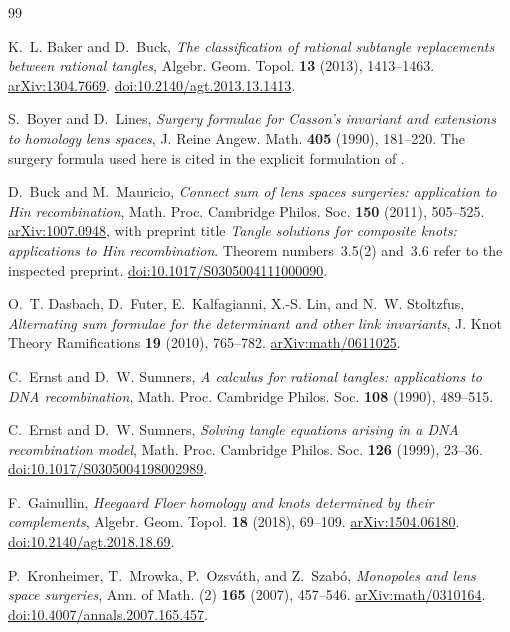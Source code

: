 \documentclass[11pt]{amsart}
\theoremstyle{definition}
\theoremstyle{remark}
\begin{document}
\begin{thebibliography}{99}

K.~L. Baker and D.~Buck,
\emph{The classification of rational subtangle replacements
between rational tangles},
Algebr. Geom. Topol. \textbf{13} (2013), 1413--1463.
\href{https://arxiv.org/abs/1304.7669}{arXiv:1304.7669}.
\href{https://doi.org/10.2140/agt.2013.13.1413}{doi:10.2140/agt.2013.13.1413}.

S.~Boyer and D.~Lines,
\emph{Surgery formulae for Casson's invariant and extensions
to homology lens spaces},
J. Reine Angew. Math. \textbf{405} (1990), 181--220.
The surgery formula used here is cited in the explicit
formulation of \cite[Proposition~3.1]{NiWu}.

D.~Buck and M.~Mauricio,
\emph{Connect sum of lens spaces surgeries: application
to Hin recombination},
Math. Proc. Cambridge Philos. Soc. \textbf{150} (2011),
505--525.
\href{https://arxiv.org/abs/1007.0948}{arXiv:1007.0948}, with preprint title
\emph{Tangle solutions for composite knots: applications to Hin recombination}.
Theorem numbers~3.5(2) and~3.6 refer to the inspected preprint.
\href{https://doi.org/10.1017/S0305004111000090}{doi:10.1017/S0305004111000090}.

O.~T. Dasbach, D.~Futer, E.~Kalfagianni,
X.-S. Lin, and N.~W. Stoltzfus,
\emph{Alternating sum formulae for the determinant
and other link invariants},
J. Knot Theory Ramifications \textbf{19} (2010),
765--782.
\href{https://arxiv.org/abs/math/0611025}{arXiv:math/0611025}.

C.~Ernst and D.~W. Sumners,
\emph{A calculus for rational tangles: applications
to DNA recombination},
Math. Proc. Cambridge Philos. Soc. \textbf{108}
(1990), 489--515.

C.~Ernst and D.~W. Sumners,
\emph{Solving tangle equations arising in a DNA recombination model},
Math. Proc. Cambridge Philos. Soc. \textbf{126} (1999), 23--36.
\href{https://doi.org/10.1017/S0305004198002989}{doi:10.1017/S0305004198002989}.

F.~Gainullin,
\emph{Heegaard Floer homology and knots determined
by their complements},
Algebr. Geom. Topol. \textbf{18} (2018), 69--109.
\href{https://arxiv.org/abs/1504.06180}{arXiv:1504.06180}.
\href{https://doi.org/10.2140/agt.2018.18.69}{doi:10.2140/agt.2018.18.69}.

P.~Kronheimer, T.~Mrowka, P.~Ozsv\'ath, and Z.~Szab\'o,
\emph{Monopoles and lens space surgeries},
Ann. of Math. (2) \textbf{165} (2007), 457--546.
\href{https://arxiv.org/abs/math/0310164}{arXiv:math/0310164}.
\href{https://doi.org/10.4007/annals.2007.165.457}{doi:10.4007/annals.2007.165.457}.


\end{thebibliography}
\end{document}
